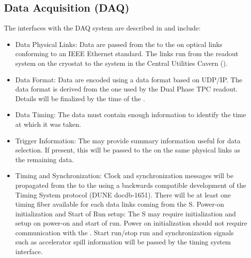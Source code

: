 \subsection{Data Acquisition (DAQ)}
\label{sec:fdsp-pd-intfc-daq}



The  interfaces with the DAQ system are described in  and include:


\begin{itemize}

\item Data Physical Links: Data are passed from the  to the  on optical links conforming to an IEEE Ethernet standard. The links run from the  readout system on the cryostat to the  system in the Central Utilities Cavern ().

\item Data Format: Data are encoded using a data format based on UDP/IP. The data format is derived from the one used by the Dual Phase TPC readout. Details will be finalized by the time of the  .

\item Data Timing: The data must contain enough information to identify the time  at which it was taken.

\item Trigger Information: The  may provide summary information useful for data selection. If present, this will be passed to the  on the same physical links as the remaining data.

\item Timing and Synchronization: Clock and synchronization messages will be propagated from the  to the  using a backwards compatible development of the  Timing System protocol (DUNE docdb-1651). There will be at least one timing fiber available for each data links coming from the S. Power-on initialization and Start of Run setup:  The S may require initialization and setup on power-on and start of run. Power on initialization should not require communication with the . Start run/stop run and synchronization signals such as accelerator spill information will be passed by the timing system interface.

\end{itemize}



